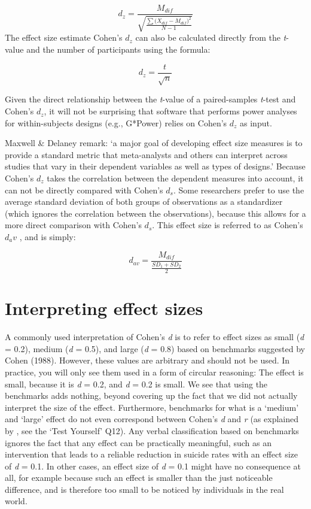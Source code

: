 \documentclass[
  oneside]{book}
\begin{document}
\[d_z = \frac{M_{dif}}{\sqrt{\frac{\sum{({X_{dif}-M_{dif})}}^2}{N-1}}}\]
The effect size estimate Cohen's \(d_z\) can also be calculated directly from the \emph{t}-value and the number of participants using the formula:

\[d_z = \frac{t}{\sqrt{n}}\]

Given the direct relationship between the \emph{t}-value of a paired-samples \emph{t}-test and Cohen's \(d_z\), it will not be surprising that software that performs power analyses for within-subjects designs (e.g., G*Power) relies on Cohen's \(d_z\) as input.

Maxwell \& Delaney \citeyearpar{maxwell_designing_2004} remark: `a major goal of developing effect size measures is to provide a standard metric that meta-analysts and others can interpret across studies that vary in their dependent variables as well as types of designs.' Because Cohen's \(d_z\) takes the correlation between the dependent measures into account, it can not be directly compared with Cohen's \(d_s\). Some researchers prefer to use the average standard deviation of both groups of observations as a standardizer (which ignores the correlation between the observations), because this allows for a more direct comparison with Cohen's \(d_s\). This effect size is referred to as Cohen's \(d_av\) \citep{cumming_understanding_2013}, and is simply:

\[d_{av} = \frac{M_{dif}}{\frac{SD_1+SD_2}{2}}\]

\hypertarget{interpreting-effect-sizes}{%
\section{Interpreting effect sizes}\label{interpreting-effect-sizes}}

A commonly used interpretation of Cohen's \emph{d} is to refer to effect sizes as small (\emph{d} = 0.2), medium (\emph{d} = 0.5), and large (\emph{d} = 0.8) based on benchmarks suggested by Cohen (1988). However, these values are arbitrary and should not be used. In practice, you will only see them used in a form of circular reasoning: The effect is small, because it is \emph{d} = 0.2, and \emph{d} = 0.2 is small. We see that using the benchmarks adds nothing, beyond covering up the fact that we did not actually interpret the size of the effect. Furthermore, benchmarks for what is a `medium' and `large' effect do not even correspond between Cohen's \emph{d} and \emph{r} (as explained by \citet{mcgrath_when_2006}, see the `Test Yourself' Q12). Any verbal classification based on benchmarks ignores the fact that any effect can be practically meaningful, such as an intervention that leads to a reliable reduction in suicide rates with an effect size of \emph{d} = 0.1. In other cases, an effect size of \emph{d} = 0.1 might have no consequence at all, for example because such an effect is smaller than the just noticeable difference, and is therefore too small to be noticed by individuals in the real world.
\end{document}
